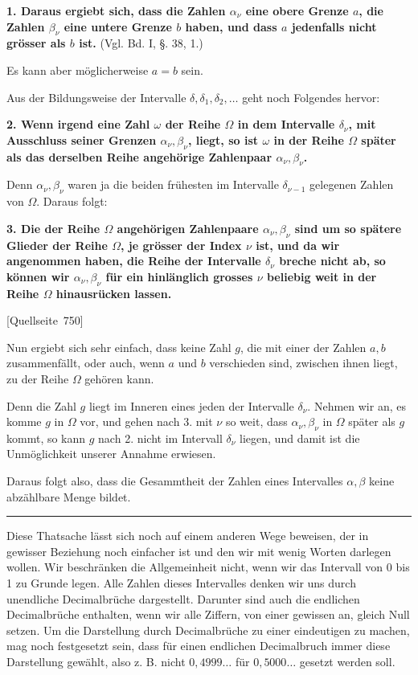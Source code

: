 \documentclass[11pt]{article}
\newcommand{\srcpage}[1]{\par\medskip\noindent\textsf{[Quellseite~#1]}\par\smallskip}
\begin{document}
\textbf{1. Daraus ergiebt sich, dass die Zahlen $\alpha_\nu$ eine obere Grenze $a$, die Zahlen $\beta_\nu$ eine untere Grenze $b$ haben, und dass $a$ jedenfalls nicht grösser als $b$ ist.} (Vgl. Bd. I, §. 38, 1.)

Es kann aber möglicherweise $a=b$ sein.

Aus der Bildungsweise der Intervalle $\delta,\delta_1,\delta_2,\ldots$ geht noch Folgendes hervor:

\textbf{2. Wenn irgend eine Zahl $\omega$ der Reihe $\Omega$ in dem Intervalle $\delta_\nu$, mit Ausschluss seiner Grenzen $\alpha_\nu,\beta_\nu$, liegt, so ist $\omega$ in der Reihe $\Omega$ später als das derselben Reihe angehörige Zahlenpaar $\alpha_\nu,\beta_\nu$.}

Denn $\alpha_\nu,\beta_\nu$ waren ja die beiden frühesten im Intervalle $\delta_{\nu-1}$ gelegenen Zahlen von $\Omega$. Daraus folgt:

\textbf{3. Die der Reihe $\Omega$ angehörigen Zahlenpaare $\alpha_\nu,\beta_\nu$ sind um so spätere Glieder der Reihe $\Omega$, je grösser der Index $\nu$ ist, und da wir angenommen haben, die Reihe der Intervalle $\delta_\nu$ breche nicht ab, so können wir $\alpha_\nu,\beta_\nu$ für ein hinlänglich grosses $\nu$ beliebig weit in der Reihe $\Omega$ hinausrücken lassen.}

\srcpage{750}
Nun ergiebt sich sehr einfach, dass keine Zahl $g$, die mit einer der Zahlen $a,b$ zusammenfällt, oder auch, wenn $a$ und $b$ verschieden sind, zwischen ihnen liegt, zu der Reihe $\Omega$ gehören kann.

Denn die Zahl $g$ liegt im Inneren eines jeden der Intervalle $\delta_\nu$. Nehmen wir an, es komme $g$ in $\Omega$ vor, und gehen nach 3. mit $\nu$ so weit, dass $\alpha_\nu,\beta_\nu$ in $\Omega$ später als $g$ kommt, so kann $g$ nach 2. nicht im Intervall $\delta_\nu$ liegen, und damit ist die Unmöglichkeit unserer Annahme erwiesen.

Daraus folgt also, dass die Gesammtheit der Zahlen eines Intervalles $\alpha,\beta$ keine abzählbare Menge bildet.

\medskip\hrule\medskip

Diese Thatsache lässt sich noch auf einem anderen Wege beweisen, der in gewisser Beziehung noch einfacher ist und den wir mit wenig Worten darlegen wollen. Wir beschränken die Allgemeinheit nicht, wenn wir das Intervall von 0 bis 1 zu Grunde legen. Alle Zahlen dieses Intervalles denken wir uns durch unendliche Decimalbrüche dargestellt. Darunter sind auch die endlichen Decimalbrüche enthalten, wenn wir alle Ziffern, von einer gewissen an, gleich Null setzen. Um die Darstellung durch Decimalbrüche zu einer eindeutigen zu machen, mag noch festgesetzt sein, dass für einen endlichen Decimalbruch immer diese Darstellung gewählt, also z. B. nicht $0{,}4999\ldots$ für $0{,}5000\ldots$ gesetzt werden soll.
\end{document}
